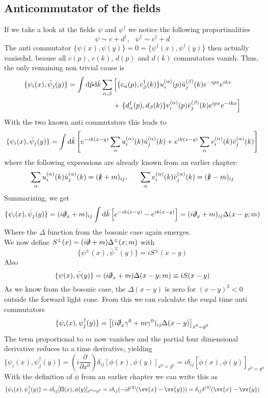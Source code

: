 \documentclass{include/thesisclass}
\newcommand{\vx}{\vv{x}}
\newcommand{\vy}{\vv{y}}
\newcommand{\dd}{{\rm d}}
\newcommand{\p}{\partial}
\begin{document}
\subsection{Anticommutator of the fields}
If we take a look at the fields $ \psi$ and $\psi^\dagger$ we notice the following proportinalities
\[\psi \sim c+d^\dagger, ~~~ \psi^\dagger \sim c^\dagger + d \]
The anti commutator $\{ \psi(x), \psi(y)\} = 0 = \{\psi^\dagger(x), \psi^\dagger(y)\}$ then actually vanisehd, beause all $ c(p)$, $ c(k)$, $d(p)$ and $d(k)$ commutators vanish.
Thus, the only remaining non trivial cause is
\begin{align*} 
\{\psi_i(x), \bar \psi_j(y)\} = \int \dd \tilde p \dd \tilde k \sum_{\alpha, \beta}& \left[ \{ c_\alpha(p), c^\dagger_\beta(k) \} u_i^{(\alpha)} (p) \bar u_j^{(\beta)}(k) e^{-ipx}e^{ikx}\right. \\
&+ \left. \{ d^\dagger_\alpha(p), d_\beta(k) \} v_i^{(\alpha)}(p)\bar v_j^{(\beta)} (k) e^{ipx} e^{-ikx} \right]
\end{align*}
With the two known anti commutators this leads to
\[ \{\psi_i(x), \bar \psi_j(y)\} =  \int \dd \tilde k \left[ e^{-ik(x-y)} \sum_\alpha u^{(\alpha)}_i (k) \bar u_j^{(\alpha)}(k) + e^{ik(x-y)} \sum_\alpha v_i^{(\alpha)}(k) \bar v_j^{(\alpha)}(k) \right]\]
where the following expressions are already known from an earlier chapter:
\[\sum_\alpha u_i^{(\alpha)} (k) \bar u_j^{(\alpha)}(k) = (\slashed k + m)_{ij}, ~~~~~ \sum_\alpha v_i^{(\alpha)} (k) \bar v_j^{(\alpha)}(k) = ( \slashed k - m)_{ij}\]
Summarizing, we get
\[ \{\psi_i(x), \bar \psi_j(y)\} = (i \slashed \p_x + m)_{ij} \int \dd \tilde k \left[ e^{-ik(x-y)} - e^{ik(x-y)}\right] = (i\slashed \p_x +m )_{ij} \Delta(x-y;m)\]
Where the $\Delta$ function from the bosonic case again emerges.\\
We now define $ S^\pm(x) = (i \slashed \p + m) \Delta^\pm(x;m)$ with
\[ \{ \psi^\pm(x), \bar \psi^\mp(y)\} = i S^\pm(x-y)\]
Also
\[ \{\psi(x), \bar \psi(y)\} = (i \slashed \p_x + m) \Delta(x-y;m) \equiv i S(x-y)\]
As we know from the bosonic case, the $\Delta(x-y)$ is zero for $(x-y)^2 <0$ outside the forward light cone.
From this we can calculate the euqal time anti commutators
\[ \{\psi_i(x), \psi_j^\dagger(y)\} = \left[ ( i \slashed \p_x \gamma^0 + m\gamma^0)_{ij} \Delta(x-y)\right]_{x^0 = y^0}\]
The term proportional to $m$ now vanishes and the partial four dimensional derivative reduces to a time derivative, yielding
\[ \{\psi_i(x), \psi_j^\dagger(y)\} = \left( i \frac{\p}{\p x^0}\right) \delta_{ij} [\phi(x), \phi(y)]_{x^0 = y^0} = i \delta_{ij} [\dot \phi(x), \phi(y)]_{x^0 = y^0}\]
With the definition of $\dot \phi$ from an earlier chapter we can write this as
\[ \{\psi_i(x), \psi_j^\dagger(y)\} = i \delta_{ij} [ \Pi(x), \phi(y)]_{x^0 = y^0} = i \delta_{ij} (-i \delta^{(3)}(\vx - \vy)) = \delta_{ij} \delta^{(3)}(\vx - \vy)\]
\end{document}
